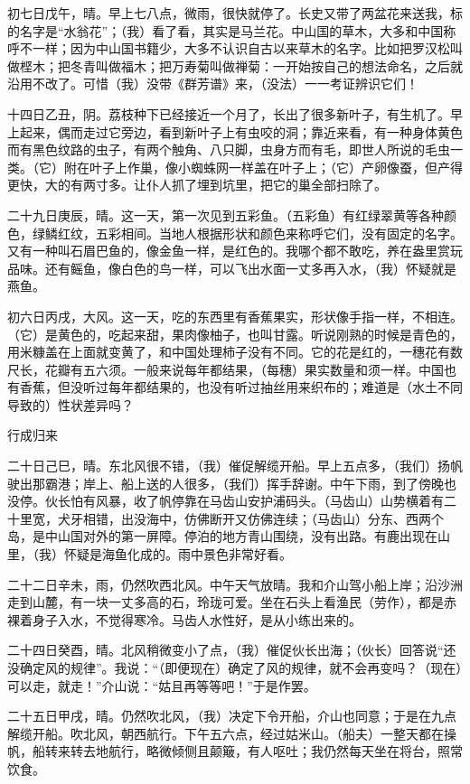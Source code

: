 \documentclass[12pt,UTF-8,openany]{ctexbook}
\begin{document}
\begin{normalsize}
    初七日戊午，晴。早上七八点，微雨，很快就停了。长史又带了两盆花来送我，标的名字是“水翁花”；（我）看了看，其实是马兰花。中山国的草木，大多和中国称呼不一样；因为中山国书籍少，大多不认识自古以来草木的名字。比如把罗汉松叫做㭴木；把冬青叫做福木；把万寿菊叫做禅菊：一开始按自己的想法命名，之后就沿用不改了。可惜（我）没带《群芳谱》来，（没法）一一考证辨识它们！
    
    十四日乙丑，阴。荔枝种下已经接近一个月了，长出了很多新叶子，有生机了。早上起来，偶而走过它旁边，看到新叶子上有虫咬的洞；靠近来看，有一种身体黄色而有黑色纹路的虫子，有两个触角、八只脚，虫身方而有毛，即世人所说的毛虫一类。（它）附在叶子上作巢，像小蜘蛛网一样盖在叶子上；（它）产卵像蚕，但产得更快，大的有两寸多。让仆人抓了埋到坑里，把它的巢全部扫除了。
    
    二十九日庚辰，晴。这一天，第一次见到五彩鱼。（五彩鱼）有红绿翠黄等各种颜色，绿鳞红纹，五彩相间。当地人根据形状和颜色来称呼它们，没有固定的名字。又有一种叫石眉巴鱼的，像金鱼一样，是红色的。我哪个都不敢吃，养在盎里赏玩品味。还有鳐鱼，像白色的鸟一样，可以飞出水面一丈多再入水，（我）怀疑就是燕鱼。
    
    初六日丙戌，大风。这一天，吃的东西里有香蕉果实，形状像手指一样，不相连。（它）是黄色的，吃起来甜，果肉像柚子，也叫甘露。听说刚熟的时候是青色的，用米糠盖在上面就变黄了，和中国处理柿子没有不同。它的花是红的，一穗花有数尺长，花瓣有五六须。一般来说每年都结果，（每穗）果实数量和须一样。中国也有香蕉，但没听过每年都结果的，也没有听过抽丝用来织布的；难道是（水土不同导致的）性状差异吗？
    
    行成归来
    
    二十日己巳，晴。东北风很不错，（我）催促解缆开船。早上五点多，（我们）扬帆驶出那霸港；岸上、船上送的人很多，（我们）挥手辞谢。中午下雨，到了傍晚也没停。伙长怕有风暴，收了帆停靠在马齿山安护浦码头。（马齿山）山势横着有二十里宽，犬牙相错，出没海中，仿佛断开又仿佛连续；（马齿山）分东、西两个岛，是中山国对外的第一屏障。停泊的地方青山围绕，没有出路。有鹿出现在山里，（我）怀疑是海鱼化成的。雨中景色非常好看。
    
    二十二日辛未，雨，仍然吹西北风。中午天气放晴。我和介山驾小船上岸；沿沙洲走到山麓，有一块一丈多高的石，玲珑可爱。坐在石头上看渔民（劳作），都是赤裸着身子入水，不觉得寒冷。马齿人水性好，是从小练出来的。
    
    二十四日癸酉，晴。北风稍微变小了点，（我）催促伙长出海；（伙长）回答说“还没确定风的规律”。我说：“（即便现在）确定了风的规律，就不会再变吗？（现在）可以走，就走！”介山说：“姑且再等等吧！”于是作罢。
    
    二十五日甲戌，晴。仍然吹北风，（我）决定下令开船，介山也同意；于是在九点解缆开船。吹北风，朝西航行。下午五六点，经过姑米山。（船夫）一整天都在操帆，船转来转去地航行，略微倾侧且颠簸，有人呕吐；我仍然每天坐在将台，照常饮食。
    

\end{normalsize}
\end{document}
